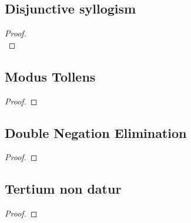 \begin{multicols}{2}

\subsection*{Disjunctive syllogism}
\begin{proof}

\\	
\end{proof}



\subsection*{Modus Tollens}

\begin{proof}
	 
\end{proof}

\subsection*{Double Negation Elimination}


	\begin{proof}
	\end{proof}

\subsection*{Tertium non datur}
	\begin{proof}
		\open
		\close
		\open
		\close
	\end{proof}


	
%
%


\end{multicols}
